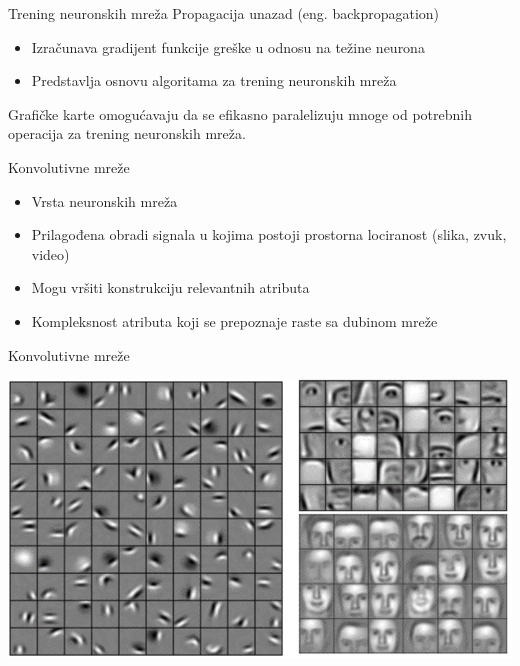 \documentclass{beamer}
\begin{document}
\begin{frame}{Trening neuronskih mreža}
    Propagacija unazad (eng. backpropagation)
    \begin{itemize}
        \item Izračunava gradijent funkcije greške u odnosu na težine neurona
        \item Predstavlja osnovu algoritama za trening neuronskih mreža
    \end{itemize}

    Grafičke karte omogućavaju da se efikasno paralelizuju mnoge od potrebnih operacija
    za trening neuronskih mreža.
\end{frame}
\begin{frame}{Konvolutivne mreže}
    \begin{itemize}
        \item Vrsta neuronskih mreža
        \item Prilagođena obradi signala u kojima postoji prostorna lociranost (slika, zvuk, video)
        \item Mogu vršiti konstrukciju relevantnih atributa
        \item Kompleksnost atributa koji se prepoznaje raste sa dubinom mreže
    \end{itemize}
\end{frame}
\begin{frame}{Konvolutivne mreže}
    \begin{center}
        \includegraphics[width=\textwidth]{./slike/covnet-visual01.png}
    \end{center}
\end{frame}
\end{document}
